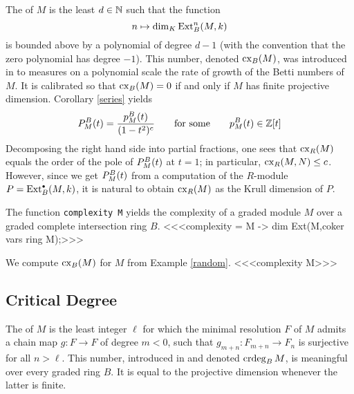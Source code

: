 The {\it{}\/} of $M$ is the least $d\in{\mathbb N}$ such that
the function
\[
n \mapsto \dim_K \operatorname{Ext}^n_B(M,k)
\]
is bounded above by a polynomial of degree $d-1$ (with the convention
that the zero polynomial has degree $-1$).  This number, denoted
$\operatorname{cx}_B(M)$, was introduced in
\cite{CI:MR90g:13027} to measures on a polynomial scale the rate of
growth of the Betti numbers of $M$.  It is calibrated so that
$\operatorname{cx}_B(M)=0$ if and only if $M$ has finite projective dimension.
Corollary \ref{series} yields
\[
{P}^B_M(t)=\frac{p^B_M(t)}{(1-t^2)^c}
\qquad\text{for some}\qquad p^B_M(t)\in{\mathbb Z}[t]
\]
Decomposing the right hand side into partial fractions, one sees that
$\operatorname{cx}_R(M)$ equals the order of the pole of ${P}^B_M(t)$ at $t=1$; in
particular, $\operatorname{cx}_R(M,N)\le c$.  However, since we get ${P}^B_M(t)$
from a computation of the $R$-module $P=\operatorname{Ext}^{\scriptscriptstyle\bullet}_B(M,k)$, it is natural
to obtain $\operatorname{cx}_R(M)$ as the Krull dimension of $P$.

\begin{sCode}
The function {\tt complexity M} yields the complexity of a graded
module $M$ over a graded complete intersection ring $B$.
<<<complexity = M -> dim Ext(M,coker vars ring M);>>>
 \end{sCode}

\begin{sExample}
We compute $\operatorname{cx}_B(M)$ for $M$ from Example \ref{random}.
<<<complexity M>>>
 \end{sExample}

\subsection{Critical Degree}

The {\it{}\/} of $M$ is the least integer $\ell$ for
which the minimal resolution $F$ of $M$ admits a chain map $g\colon
F\to F$ of degree $m<0$, such that $g_{m+n}\colon F_{m+n}\to F_n$ is
surjective for all $n>\ell$.  This number, introduced in
\cite{CI:MR99c:13033} and denoted $\operatorname{crdeg}_BM$, is meaningful over every
graded ring $B$.  It is equal to the projective dimension whenever the
latter is finite.

